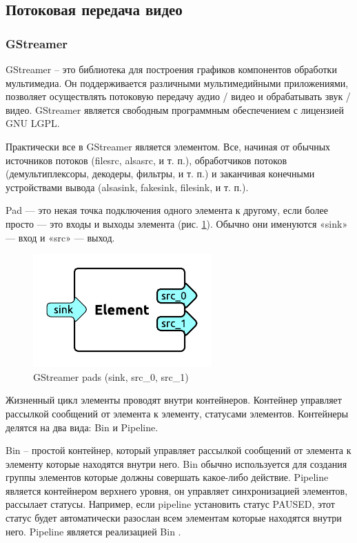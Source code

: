\subsection{Потоковая передача видео}

\subsubsection{GStreamer}

GStreamer -- это библиотека для построения графиков компонентов обработки мультимедиа. Он поддерживается различными мультимедийными приложениями, позволяет осуществлять потоковую передачу аудио / видео и обрабатывать звук / видео. GStreamer является свободным программным обеспечением с лицензией GNU LGPL.

Практически все в GStreamer является элементом. Все, начиная от обычных источников потоков (filesrc, alsasrc, и т. п.), обработчиков потоков (демультиплексоры, декодеры, фильтры, и т. п.) и заканчивая конечными устройствами вывода (alsasink, fakesink, filesink, и т. п.).

Pad — это некая точка подключения одного элемента к другому, если более просто — это входы и выходы элемента (рис. \ref{fig:ris1}). Обычно они именуются «sink» — вход и «src» — выход.
\begin{figure}[H]
	\centering
	\includegraphics[width=0.5\linewidth]{pics/pic1}
	\caption{ GStreamer pads (sink, src\_0, src\_1)
	}
	\label{fig:ris1}
\end{figure}
Жизненный цикл элементы проводят внутри контейнеров. Контейнер управляет рассылкой сообщений от элемента к элементу, статусами элементов. Контейнеры делятся на два вида: Bin и Pipeline.

Bin -- простой контейнер, который управляет рассылкой сообщений от элемента к элементу которые находятся внутри него. Bin обычно используется для создания группы элементов которые должны совершать какое-либо действие. 
Pipeline является контейнером верхнего уровня, он управляет синхронизацией элементов, рассылает статусы. Например, если pipeline установить статус PAUSED, этот статус будет автоматически разослан всем элементам которые находятся внутри него. Pipeline является реализацией Bin \cite{gstreamer}. 

